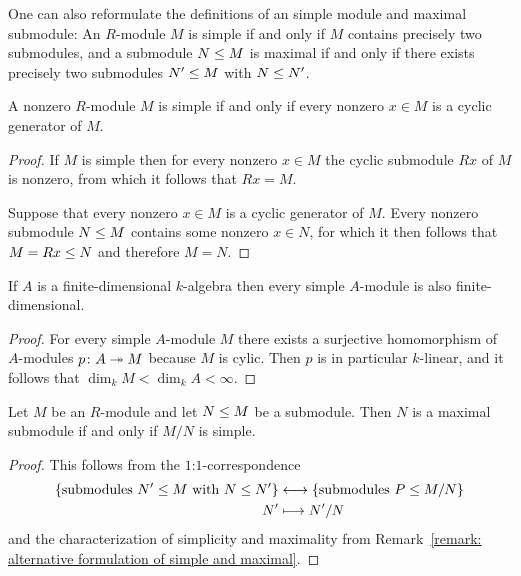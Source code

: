\begin{remark}
  \label{remark: alternative formulation of simple and maximal}
  One can also reformulate the definitions of an simple module and maximal submodule:
  An $R$-module $M$ is simple if and only if $M$ contains precisely two submodules, and a submodule $N \leq M$ is maximal if and only if there exists precisely two submodules $N' \leq M$ with $N \leq N'$.
\end{remark}


\begin{lemma}
  \label{lemma: simple iff every cyclic generator}
  A nonzero $R$-module $M$ is simple if and only if every nonzero $x \in M$ is a cyclic generator of $M$. 
\end{lemma}


\begin{proof}
  If $M$ is simple then for every nonzero $x \in M$ the cyclic submodule $Rx$ of $M$ is nonzero, from which it follows that $Rx = M$.
  
  Suppose that every nonzero $x \in M$ is a cyclic generator of $M$.
  Every nonzero submodule $N \leq M$ contains some nonzero $x \in N$, for which it then follows that $M = Rx \leq N$ and therefore $M = N$.
\end{proof}


\begin{corollary}
  \label{corollary: simple modules over fd algebras are fd}
  If $A$ is a finite-dimensional $k$-algebra then every simple $A$-module is also finite-dimensional.
\end{corollary}


\begin{proof}
  For every simple $A$-module $M$ there exists a surjective homomorphism of $A$-modules $p \colon A \twoheadrightarrow M$ because $M$ is cylic.
  Then $p$ is in particular $k$-linear, and it follows that $\dim_k M < \dim_k A < \infty$.
\end{proof}


\begin{lemma}
  \label{lemma: maximal iff quotient is simple}
  Let $M$ be an $R$-module and let $N \leq M$ be a submodule.
  Then $N$ is a maximal submodule if and only if $M/N$ is simple.
\end{lemma}


\begin{proof}
  This follows from the $1$:$1$-correspondence
  \begin{align*}
    \{ \text{submodules $N' \leq M$ with $N \leq N'$} \}
    &\longleftrightarrow
    \{ \text{submodules $P \leq M/N$} \}
    \\
                  N'
    &\longmapsto  N'/N
  \end{align*}
  and the characterization of simplicity and maximality from Remark~\ref{remark: alternative formulation of simple and maximal}.
\end{proof}


